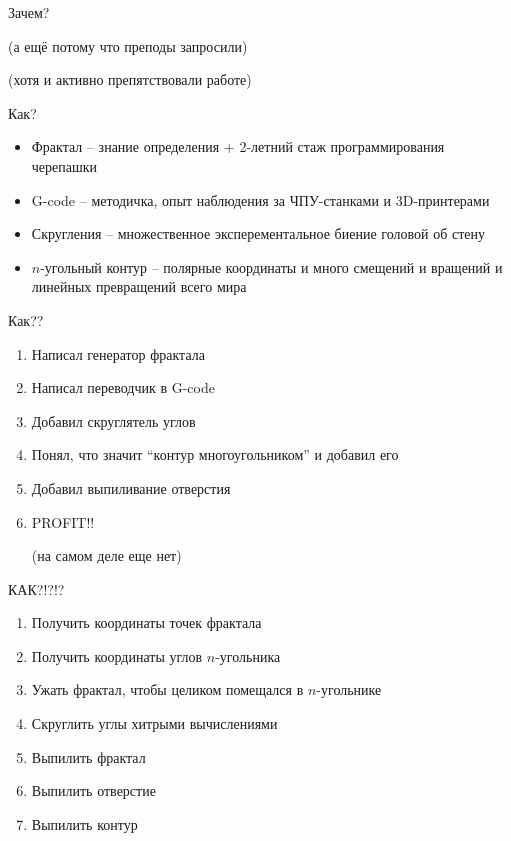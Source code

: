 \documentclass[11pt]{beamer}
\begin{document}
\begin{frame}{Зачем?}
\begin{small}
(а ещё потому что преподы запросили)
\end{small}\begin{tiny}
(хотя и активно препятствовали работе)
\end{tiny}

\end{frame}
\begin{frame}{Как?}
\begin{itemize}
\item Фрактал -- знание определения + 2-летний стаж программирования черепашки
\item G-code -- методичка, опыт наблюдения за ЧПУ-станками и 3D-принтерами \item Скругления -- множественное эксперементальное биение головой об стену
\item $n$-угольный контур -- полярные координаты и много смещений и вращений и линейных превращений всего мира
\end{itemize}


\end{frame}

\begin{frame}{Как??}
\begin{enumerate}
\item Написал генератор фрактала
\item Написал переводчик в G-code
\item Добавил скруглятель углов
\item Понял, что значит ``контур многоугольником'' и добавил его
\item Добавил выпиливание отверстия
\item PROFIT!! \begin{tiny}(на самом деле еще нет)\end{tiny}
\end{enumerate}

\end{frame}

\begin{frame}{КАК?!?!?}

\begin{enumerate}
\item Получить координаты точек фрактала
\item Получить координаты углов $n$-угольника
\item Ужать фрактал, чтобы целиком помещался в $n$-угольнике
\item Скруглить углы хитрыми вычислениями
\item Выпилить фрактал
\item Выпилить отверстие
\item Выпилить контур
\end{enumerate}

\end{frame}
\end{document}
